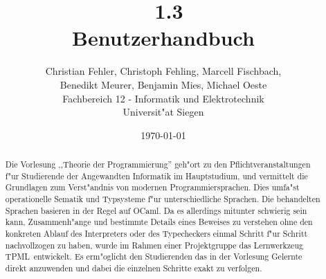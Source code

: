 \documentclass[a4paper,fleqn,latin1,twoside,12pt]{report}
\title{{\Huge \TPML\ 1.3}\\Benutzerhandbuch}
\author{{\Large Christian Fehler, Christoph Fehling, Marcell Fischbach,}\\{\Large Benedikt Meurer, Benjamin Mies, Michael Oeste}\\Fachbereich 12 - Informatik und Elektrotechnik\\Universit"at Siegen}
\date{\small\today}
\newcommand{\TPML}{\textsf{\textmd{TPML}}}
\begin{document}
\maketitle

\begin{abstract}
Die Vorlesung ,,Theorie der Programmierung'' geh"ort zu den Pflichtveranstaltungen
f"ur Studierende der Angewandten Informatik im Hauptstudium, und vermittelt die Grundlagen
zum Verst"andnis von modernen Programmiersprachen. Dies umfa"st operationelle Sematik und
Typsysteme f"ur unterschiedliche Sprachen. Die behandelten Sprachen basieren in der Regel
auf OCaml. Da es allerdings mitunter schwierig sein kann, Zusammenh"ange und bestimmte Details
eines Beweises zu verstehen ohne den konkreten Ablauf des Interpreters oder des Typecheckers
einmal Schritt f"ur Schritt nachvollzogen zu haben, wurde im Rahmen einer Projektgruppe das
Lernwerkzeug \TPML\ entwickelt. Es erm"oglicht den Studierenden das in der Vorlesung Gelernte
direkt anzuwenden und dabei die einzelnen Schritte exakt zu verfolgen.
\end{abstract}

\tableofcontents
\newpage









\begin{appendix}

\end{appendix}

\printindex
\end{document}
